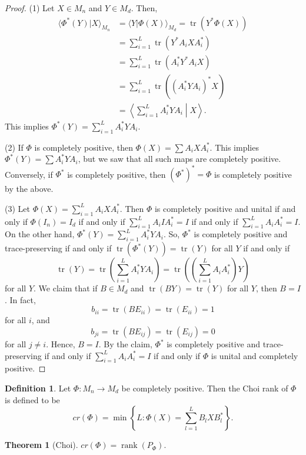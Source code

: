 \documentclass[12pt]{article}
\theoremstyle{definition}
\newtheorem*{theorem}{Theorem}
\newtheorem*{definition}{Definition}
\DeclareMathOperator{\tr}{tr}
\begin{document}
\begin{proof}
(1) Let $X \in M_n$ and $Y \in M_d$. Then,
\begin{align*}
\langle \Phi^*(Y)|X\rangle_{M_n} &= \langle Y|\Phi(X)\rangle_{M_d} = \tr(Y^*\Phi(X)) \\
&= \sum_{i=1}^L \tr(Y^*A_iXA_i^*) \\
&= \sum_{i=1}^L \tr(A_i^*Y^*A_iX) \\
&= \sum_{i=1}^L \tr((A_i^*YA_i)^*X) \\
&= \left\langle \sum_{i=1}^L A_i^*YA_i \middle| X\right\rangle.
\end{align*}
This implies $\Phi^*(Y)=\sum_{i=1}^L A_i^*YA_i$.

(2) If $\Phi$ is completely positive, then $\Phi(X)=\sum A_iXA_i^*$. This implies $\Phi^*(Y)=\sum A_i^*YA_i$, but we saw that all such maps are completely positive.
Conversely, if $\Phi^*$ is completely positive, then $(\Phi^*)^*=\Phi$ is completely positive by the above.

(3) Let $\Phi(X)=\sum_{i=1}^L A_iXA_i^*$. Then $\Phi$ is completely positive and unital if and only if $\Phi(I_n)=I_d$ if and only if $\sum_{i=1}^L A_iIA_i^*=I$ if and only if $\sum_{i=1}^L A_iA_i^*=I$.
On the other hand, $\Phi^*(Y)=\sum_{i=1}^L A_i^*YA_i$. So, $\Phi^*$ is completely positive and trace-preserving if and only if $\tr(\Phi^*(Y))=\tr(Y)$ for all $Y$ if and only if
\[
\tr(Y)=\tr\left(\sum_{i=1}^L A_i^*YA_i\right) = \tr\left(\left(\sum_{i=1}^L A_iA_i^*\right)Y\right)
\]
for all $Y$.
We claim that if $B \in M_d$ and $\tr(BY)=\tr(Y)$ for all $Y$, then $B=I$. In fact,
\[
b_{ii}=\tr(BE_{ii})=\tr(E_{ii})=1
\]
for all $i$, and
\[
b_{ji}=\tr(BE_{ij})=\tr(E_{ij})=0
\]
for all $j \neq i$. Hence, $B=I$.
By the claim, $\Phi^*$ is completely positive and trace-preserving if and only if $\sum_{i=1}^L A_iA_i^*=I$ if and only if $\Phi$ is unital and completely positive.
\end{proof}

\begin{definition}
Let $\Phi:M_n \to M_d$ be completely positive. Then the Choi rank of $\Phi$ is defined to be
\[
cr(\Phi) = \min\left\{L : \Phi(X)=\sum_{l=1}^L B_lXB_l^*\right\}.
\]
\end{definition}

\begin{theorem}[Choi]
$cr(\Phi)=\operatorname{rank}(P_\Phi)$.
\end{theorem}
\end{document}

